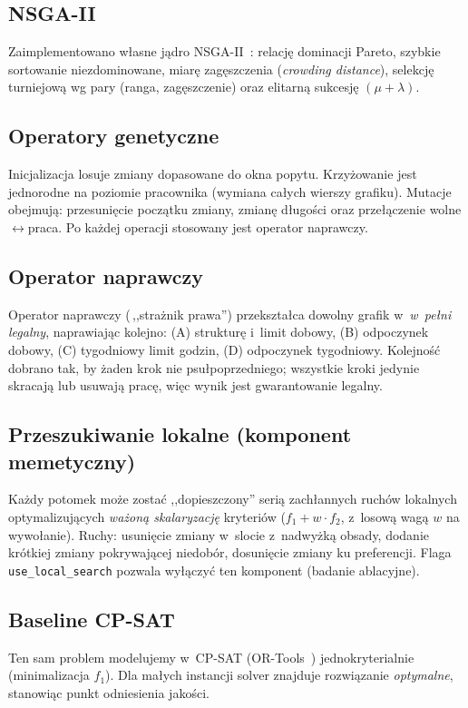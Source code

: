 \documentclass[11pt,a4paper]{article}
\begin{document}
\subsection{NSGA-II}
Zaimplementowano w\l asne j\k{a}dro NSGA-II~\cite{deb2002nsga2}: relacj\k{e} dominacji
Pareto, szybkie sortowanie niezdominowane, miar\k{e} zag\k{e}szczenia (\emph{crowding
distance}), selekcj\k{e} turniejow\k{a} wg pary (ranga, zag\k{e}szczenie) oraz
elitarn\k{a} sukcesj\k{e} $(\mu+\lambda)$.

\subsection{Operatory genetyczne}
Inicjalizacja losuje zmiany dopasowane do okna popytu. Krzy\.zowanie jest jednorodne
na poziomie pracownika (wymiana ca\l ych wierszy grafiku). Mutacje obejmuj\k{a}:
przesuni\k{e}cie pocz\k{a}tku zmiany, zmian\k{e} d\l ugo\'sci oraz prze\l \k{a}czenie
wolne$\leftrightarrow$praca. Po ka\.zdej operacji stosowany jest operator naprawczy.

\subsection{Operator naprawczy}
\label{sec:repair}
Operator naprawczy (\,,,stra\.znik prawa'') przekszta\l ca dowolny grafik w~\emph{w~pe\l ni
legalny}, naprawiaj\k{a}c kolejno: (A) struktur\k{e} i~limit dobowy, (B) odpoczynek
dobowy, (C) tygodniowy limit godzin, (D) odpoczynek tygodniowy. Kolejno\'s\'c dobrano
tak, by \.zaden krok nie psu\l poprzedniego; wszystkie kroki jedynie skracaj\k{a} lub
usuwaj\k{a} prac\k{e}, wi\k{e}c wynik jest gwarantowanie legalny.

\subsection{Przeszukiwanie lokalne (komponent memetyczny)}
Ka\.zdy potomek mo\.ze zosta\'c ,,dopieszczony'' seri\k{a} zach\l annych ruch\'ow
lokalnych optymalizuj\k{a}cych \emph{wa\.zon\k{a} skalaryzacj\k{e}} kryteri\'ow
($f_1 + w\cdot f_2$, z~losow\k{a} wag\k{a} $w$ na wywo\l anie). Ruchy: usuni\k{e}cie
zmiany w~slocie z~nadwy\.zk\k{a} obsady, dodanie kr\'otkiej zmiany pokrywaj\k{a}cej
niedob\'or, dosuni\k{e}cie zmiany ku preferencji. Flaga \texttt{use\_local\_search}
pozwala wy\l \k{a}czy\'c ten komponent (badanie ablacyjne).

\subsection{Baseline CP-SAT}
Ten sam problem modelujemy w~CP-SAT (OR-Tools~\cite{ortools}) jednokryterialnie
(minimalizacja $f_1$). Dla ma\l ych instancji solver znajduje rozwi\k{a}zanie
\emph{optymalne}, stanowi\k{a}c punkt odniesienia jako\'sci.
\end{document}
